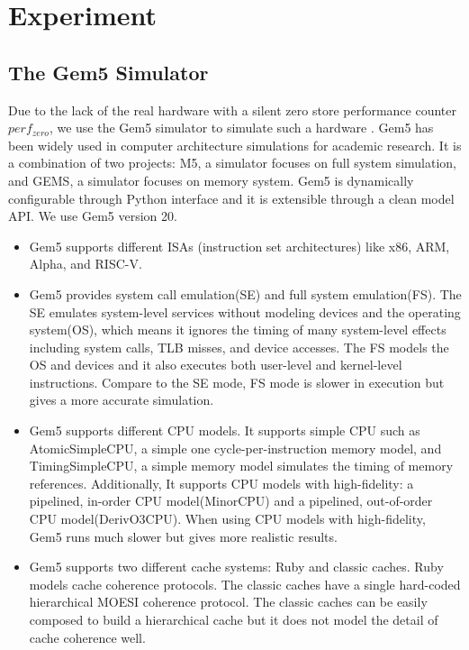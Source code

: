 \documentclass{iacrtrans}
\begin{document}
\section{Experiment}
\subsection{The Gem5 Simulator}
Due to the lack of the real hardware with a silent zero store performance counter $perf_{zero}$, we use the Gem5 simulator to simulate such a hardware \cite{binkert2011gem5}. Gem5 has been widely used in computer architecture simulations for academic research. It is a combination of two projects: M5, a simulator focuses on full system simulation, and GEMS, a simulator focuses on memory system. Gem5 is dynamically configurable through Python interface and it is extensible through a clean model API. We use Gem5 version 20.
\begin{itemize}
    \item Gem5 supports different ISAs (instruction set architectures) like x86, ARM, Alpha, and RISC-V. 
    \item Gem5 provides system call emulation(SE) and full system emulation(FS). The SE emulates system-level services without modeling devices and the operating system(OS), which means it ignores the timing of many system-level effects including system calls, TLB misses, and device accesses. The FS models the OS and devices and it also executes both user-level and kernel-level instructions. Compare to the SE mode, FS mode is slower in execution but gives a more accurate simulation.
    \item Gem5 supports different CPU models. It supports simple CPU such as AtomicSimpleCPU, a simple one cycle-per-instruction memory model, and TimingSimpleCPU, a simple memory model simulates the timing of memory references. Additionally, It supports CPU models with high-fidelity: a pipelined, in-order CPU model(MinorCPU) and a pipelined, out-of-order CPU model(DerivO3CPU). When using CPU models with high-fidelity, Gem5 runs much slower but gives more realistic results.
    \item Gem5 supports two different cache systems: Ruby and classic caches. Ruby models cache coherence protocols. The classic caches have a single hard-coded hierarchical MOESI coherence protocol. The classic caches can be easily composed to build a hierarchical cache but it does not model the detail of cache coherence well.  
\end{itemize}
\end{document}
